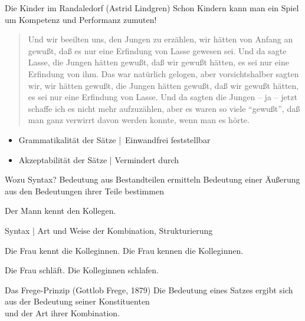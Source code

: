  
\begin{frame}
  {Die Kinder im Randaledorf (Astrid Lindgren)}
  \onslide<+->
  \onslide<+->
  Schon Kindern kann man ein Spiel um Kompetenz und Performanz zumuten!\\
  \Zeile
  \onslide<+->
  \begin{quote}
    Und wir beeilten uns, den Jungen zu erzählen, wir hätten von Anfang an gewußt, daß es nur eine
    Erfindung von Lasse gewesen sei. Und da sagte Lasse, die Jungen hätten gewußt, daß wir gewußt
    hätten, es sei nur eine Erfindung von ihm. Das war natürlich gelogen, aber vorsichtshalber sagten
    wir, wir hätten gewußt, die Jungen hätten gewußt, daß wir gewußt hätten, es sei nur eine Erfindung
    von Lasse. Und da sagten die Jungen -- ja -- jetzt schaffe ich es nicht mehr aufzuzählen, aber es
    waren so viele "`gewußt"', daß man ganz verwirrt davon werden konnte, wenn man es hörte.
  \end{quote}
  \Zeile
  \begin{itemize}[<+->]
    \item \alert{Grammatikalität} der Sätze | Einwandfrei feststellbar
    \item \alert{Akzeptabilität} der Sätze | Vermindert durch 
  \end{itemize}
\end{frame}

\begin{frame}
  {Wozu Syntax? Bedeutung aus Bestandteilen ermitteln}
  \onslide<+->
  \onslide<+->
  Bedeutung einer Äußerung aus den Bedeutungen ihrer Teile bestimmen\\
  \Viertelzeile
  \onslide<+->
  \begin{exe}
    \ex Der Mann kennt den Kollegen.
  \end{exe}
  \Halbzeile
  \onslide<+->
  \alert{Syntax} | Art und Weise der Kombination, Strukturierung\\
  \Viertelzeile
  \onslide<+->
  \begin{exe}
    \ex
    \begin{xlist}
      \ex Die Frau kennt die Kolleginnen.
      \ex Die Frau kennen die Kolleginnen.
    \end{xlist}
    \onslide<+->
    \ex
    \begin{xlist}
      \ex Die Frau schläft.
      \ex Die Kolleginnen schlafen.
    \end{xlist}
  \end{exe}
  \Halbzeile
  \onslide<+->
  \begin{block}
    {Das Frege-Prinzip (Gottlob Frege, 1879)}
    Die Bedeutung eines Satzes ergibt sich aus der Bedeutung seiner Konstituenten\\
    und der Art ihrer Kombination.
  \end{block}
\end{frame}
 

